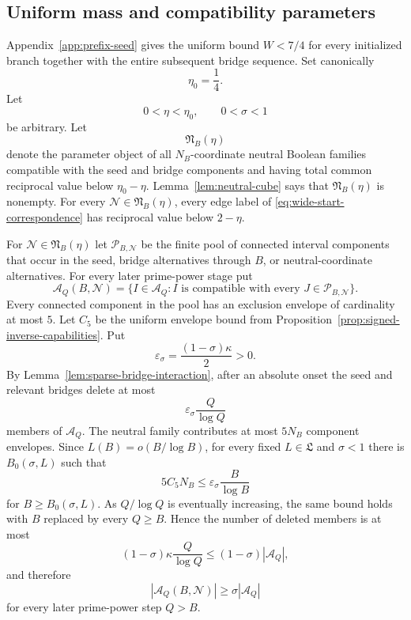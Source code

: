 \subsection{Uniform mass and compatibility parameters}

Appendix~\ref{app:prefix-seed} gives the uniform bound $W<7/4$ for every initialized branch together with the entire subsequent bridge sequence.  Set canonically
\begin{equation}\label{eq:canonical-mass-margin}
\eta_0=\frac14.
\end{equation}
Let
\[
0<\eta<\eta_0,
\qquad
0<\sigma<1
\]
be arbitrary.  Let
\begin{equation}\label{eq:neutral-family-parameter-object}
\mathfrak N_B(\eta)
\end{equation}
denote the parameter object of all $N_B$-coordinate neutral Boolean families compatible with the seed and bridge components and having total common reciprocal value below $\eta_0-\eta$.  Lemma~\ref{lem:neutral-cube} says that $\mathfrak N_B(\eta)$ is nonempty.  For every $\mathscr N\in\mathfrak N_B(\eta)$, every edge label of \eqref{eq:wide-start-correspondence} has reciprocal value below $2-\eta$.

For $\mathscr N\in\mathfrak N_B(\eta)$ let $\mathscr P_{B,\mathscr N}$ be the finite pool of connected interval components that occur in the seed, bridge alternatives through $B$, or neutral-coordinate alternatives.  For every later prime-power stage put
\begin{equation}\label{eq:compatible-subfamily}
\mathcal A_Q(B,\mathscr N)
=
\{I\in\mathcal A_Q:I\text{ is compatible with every }J\in\mathscr P_{B,\mathscr N}\}.
\end{equation}
Every connected component in the pool has an exclusion envelope of cardinality at most $5$.  Let $C_5$ be the uniform envelope bound from Proposition~\ref{prop:signed-inverse-capabilities}.  Put
\[
\varepsilon_\sigma=\frac{(1-\sigma)\kappa}{2}>0.
\]
By Lemma~\ref{lem:sparse-bridge-interaction}, after an absolute onset the seed and relevant bridges delete at most
\[
\varepsilon_\sigma\frac Q{\log Q}
\]
members of $\mathcal A_Q$.  The neutral family contributes at most $5N_B$ component envelopes.  Since $L(B)=o(B/\log B)$, for every fixed $L\in\mathfrak L$ and $\sigma<1$ there is $B_0(\sigma,L)$ such that
\[
5C_5N_B
\le
\varepsilon_\sigma\frac B{\log B}
\]
for $B\ge B_0(\sigma,L)$.  As $Q/\log Q$ is eventually increasing, the same bound holds with $B$ replaced by every $Q\ge B$.  Hence the number of deleted members is at most
\[
(1-\sigma)\kappa\frac Q{\log Q}
\le
(1-\sigma)|\mathcal A_Q|,
\]
and therefore
\begin{equation}\label{eq:wide-survivor-fraction}
|\mathcal A_Q(B,\mathscr N)|\ge\sigma|\mathcal A_Q|
\end{equation}
for every later prime-power step $Q>B$.

